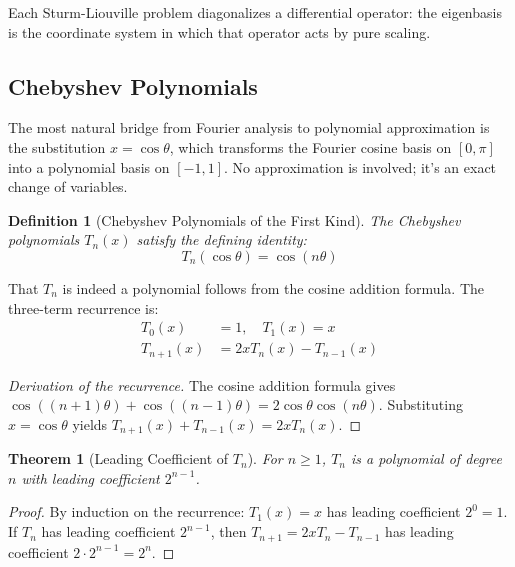 \documentclass[12pt,a4paper]{report}
\theoremstyle{thms}
\newtheorem{theorem}{Theorem}[section]
\theoremstyle{defns}
\newtheorem{definition}{Definition}[section]
\begin{document}
Each Sturm-Liouville problem diagonalizes a differential operator: the eigenbasis is the coordinate system in which that operator acts by pure scaling.

\subsection{Chebyshev Polynomials}

The most natural bridge from Fourier analysis to polynomial approximation is the substitution $x = \cos\theta$, which transforms the Fourier cosine basis on $[0, \pi]$ into a polynomial basis on $[-1, 1]$. No approximation is involved; it's an exact change of variables.

\begin{definition}[Chebyshev Polynomials of the First Kind]
    The Chebyshev polynomials $T_n(x)$ satisfy the defining identity:
    \begin{equation}
        T_n(\cos\theta) = \cos(n\theta)
        \label{eq:chebyshev_identity}
    \end{equation}
\end{definition}

That $T_n$ is indeed a polynomial follows from the cosine addition formula. The three-term recurrence is:
\begin{align}
    T_0(x) &= 1, \quad T_1(x) = x \\
    T_{n+1}(x) &= 2xT_n(x) - T_{n-1}(x)
    \label{eq:chebyshev_recurrence}
\end{align}

\begin{proof}[Derivation of the recurrence]
    The cosine addition formula gives $\cos((n+1)\theta) + \cos((n-1)\theta) = 2\cos\theta\cos(n\theta)$. Substituting $x = \cos\theta$ yields $T_{n+1}(x) + T_{n-1}(x) = 2xT_n(x)$.
\end{proof}

\begin{theorem}[Leading Coefficient of $T_n$]
    For $n \geq 1$, $T_n$ is a polynomial of degree $n$ with leading coefficient $2^{n-1}$.
    \label{thm:chebyshev_leading}
\end{theorem}

\begin{proof}
    By induction on the recurrence: $T_1(x) = x$ has leading coefficient $2^0 = 1$. If $T_n$ has leading coefficient $2^{n-1}$, then $T_{n+1} = 2xT_n - T_{n-1}$ has leading coefficient $2 \cdot 2^{n-1} = 2^n$.
\end{proof}
\end{document}
